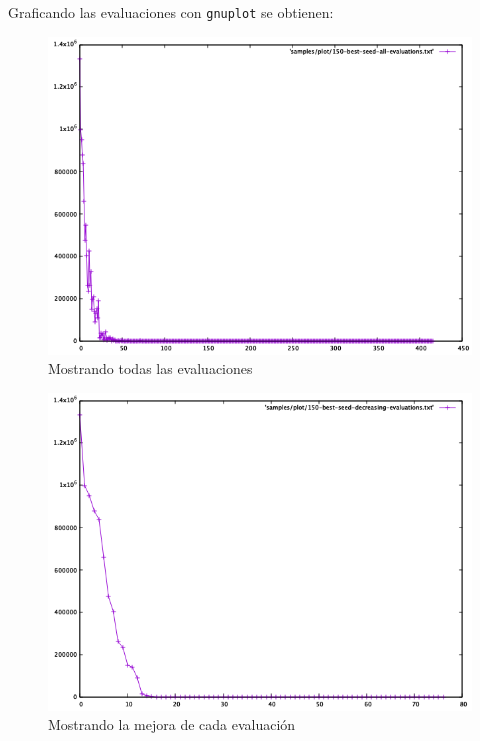 \documentclass{article}
\begin{document}
Graficando las evaluaciones con \texttt{gnuplot} se obtienen:
\begin{figure}[H]
  \centering
  \includegraphics[scale=0.45]{assets/img/150-best-seed-all-evaluations.png}
  \caption{Mostrando todas las evaluaciones}
\end{figure}

\begin{figure}[H]
  \centering
  \includegraphics[scale=0.45]{assets/img/150-best-seed-decreasing-evaluations.png}
  \caption{Mostrando la mejora de cada evaluación}
\end{figure}
\end{document}
